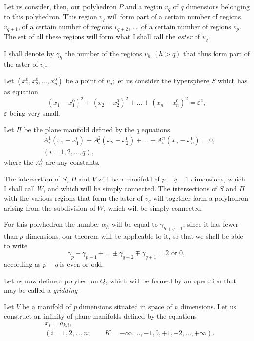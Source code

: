 \documentclass{article}
\begin{document}
Let us consider, then, our polyhedron $P$ and a region $v_{q}$ of $q$ dimensions belonging to this polyhedron. This region $v_{q}$ will form part of a certain number of regions $v_{q+1}$, of a certain number of regions $v_{q+2}$, \ldots, of a certain number of regions $v_{p}$. The set of all these regions will form what I shall call the \emph{aster} of $v_{q}$.

I shall denote by $\gamma_{h}$ the number of the regions $v_{h}$ $(h > q)$ that thus form part of the aster of $v_{q}$.

Let $(x^{0}_{1}, x^{0}_{2}, \ldots, x^{0}_{n})$ be a point of $v_{q}$; let us consider the hypersphere $S$ which has as equation
\[ (x_{1} - x^{0}_{1})^{2} + (x_{2} - x^{0}_{2})^{2} + \ldots + (x_{n} - x^{0}_{n})^{2} = \varepsilon^{2}, \]
$\varepsilon$ being very small.

Let $\Pi$ be the plane manifold defined by the $q$ equations
\[ \begin{aligned} &A^{1}_{i}(x_{1} - x^{0}_{1}) + A^{2}_{i}(x_{2} - x^{0}_{2}) + \ldots + A^{n}_{i}(x_{n} - x^{0}_{n}) = 0,\\ &(i = 1, 2, \ldots, q), \end{aligned} \]
where the $A^{k}_{i}$ are any constants.

The intersection of $S$, $\Pi$ and $V$ will be a manifold of $p - q - 1$ dimensions, which I shall call $W$, and which will be simply connected. The intersections of $S$ and $\Pi$ with the various regions that form the aster of $v_{q}$ will together form a polyhedron arising from the subdivision of $W$, which will be simply connected.

For this polyhedron the number $\alpha_{h}$ will be equal to $\gamma_{h+q+1}$; since it has fewer than $p$ dimensions, our theorem will be applicable to it, so that we shall be able to write
\[ \gamma_{p} - \gamma_{p-1} + \ldots \pm \gamma_{q+2} \mp \gamma_{q+1} = 2 \text{ or } 0, \tag{A} \]
according as $p - q$ is even or odd.

Let us now define a polyhedron $Q$, which will be formed by an operation that may be called a \emph{gridding}.

Let $V$ be a manifold of $p$ dimensions situated in space of $n$ dimensions. Let us construct an infinity of plane manifolds defined by the equations
\[ \begin{aligned} &x_{i} = a_{k.i},\\ &(i = 1, 2, \ldots, n; \qquad K = -\infty, \ldots, -1, 0, +1, +2, \ldots, +\infty). \end{aligned} \tag{B} \]
\end{document}
